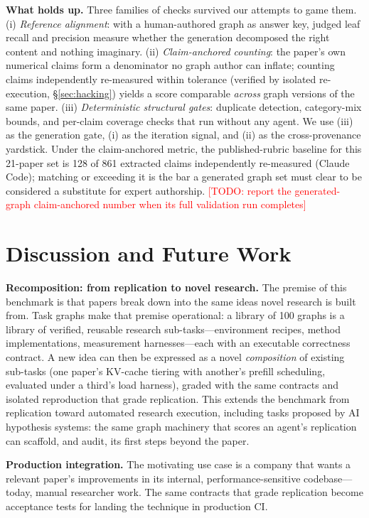 \documentclass{article}
\newcommand{\todo}[1]{\textcolor{red}{[TODO: #1]}}
\begin{document}
\textbf{What holds up.} Three families of checks survived our attempts to
game them. (i) \emph{Reference alignment}: with a human-authored graph as
answer key, judged leaf recall and precision measure whether the generation
decomposed the right content and nothing imaginary. (ii)
\emph{Claim-anchored counting}: the paper's own numerical claims form a
denominator no graph author can inflate; counting claims independently
re-measured within tolerance (verified by isolated re-execution,
\S\ref{sec:hacking}) yields a score comparable \emph{across} graph versions
of the same paper. (iii) \emph{Deterministic structural gates}: duplicate
detection, category-mix bounds, and per-claim coverage checks that run
without any agent. We use (iii) as the generation gate, (i) as the iteration
signal, and (ii) as the cross-provenance yardstick. Under the claim-anchored
metric, the published-rubric baseline for this 21-paper set is 128 of 861
extracted claims independently re-measured (Claude Code); matching or
exceeding it is the bar a generated graph set must clear to be considered a
substitute for expert authorship. \todo{report the generated-graph
claim-anchored number when its full validation run completes}

\section{Discussion and Future Work}

\textbf{Recomposition: from replication to novel research.} The premise of
this benchmark is that papers break down into the same ideas novel research
is built from. Task graphs make that premise operational: a library of 100
graphs is a library of verified, reusable research sub-tasks---environment
recipes, method implementations, measurement harnesses---each with an
executable correctness contract. A new idea can then be expressed as a novel
\emph{composition} of existing sub-tasks (one paper's KV-cache tiering with
another's prefill scheduling, evaluated under a third's load harness), graded
with the same contracts and isolated reproduction that grade replication.
This extends the benchmark from replication toward automated research
execution, including tasks proposed by AI hypothesis systems: the same graph
machinery that scores an agent's replication can scaffold, and audit, its
first steps beyond the paper.

\textbf{Production integration.} The motivating use case is a company that
wants a relevant paper's improvements in its internal, performance-sensitive
codebase---today, manual researcher work. The same contracts that grade
replication become acceptance tests for landing the technique in production
CI.
\end{document}
